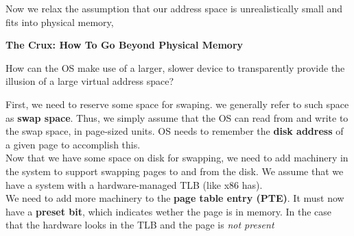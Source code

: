 Now we relax the assumption that our address space is unrealistically small
and fits into physical memory,

\begin{tcolorbox}
    \begin{center}
        \textbf{The Crux: How To Go Beyond Physical Memory}
    \end{center}

    How can the OS make use of a larger, slower device to transparently provide
    the illusion of a large virtual address space?
\end{tcolorbox}

First, we need to reserve some space for swaping. we generally refer to such
space as \textbf{swap space}. Thus, we simply assume that the OS can read from
and write to the swap space, in page-sized units. OS needs to remember the
\textbf{disk address} of a given page to accomplish this.\\

Now that we have some space on disk for swapping, we need to add machinery in
the system to support swapping pages to and from the disk. We assume that we
have a system with a hardware-managed TLB (like x86 has).\\

We need to add more machinery to the \textbf{page table entry (PTE)}. It must
now have a \textbf{preset bit}, which indicates wether the page is in memory.
In the case that the hardware looks in the TLB and the page is \textit{not
present} 
